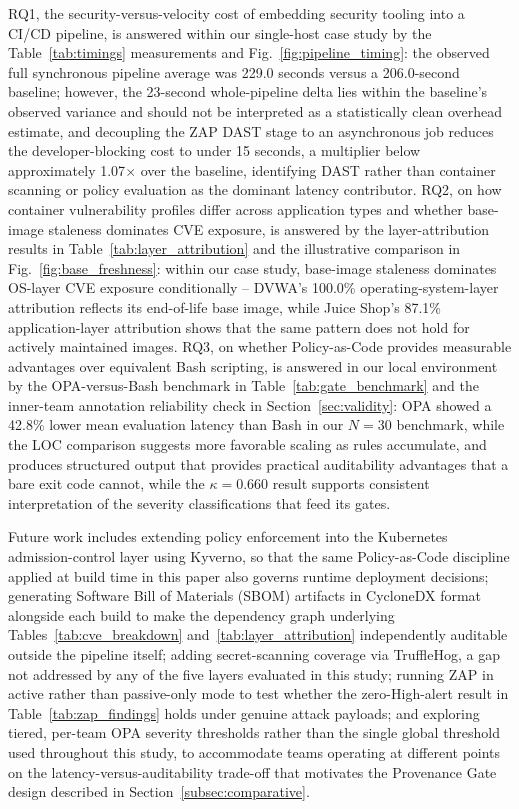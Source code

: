 \documentclass[conference]{IEEEtran}
\begin{document}
RQ1, the security-versus-velocity cost of embedding security tooling into a CI/CD pipeline, is answered within our single-host case study by the Table~\ref{tab:timings} measurements and Fig.~\ref{fig:pipeline_timing}: the observed full synchronous pipeline average was 229.0 seconds versus a 206.0-second baseline; however, the 23-second whole-pipeline delta lies within the baseline's observed variance and should not be interpreted as a statistically clean overhead estimate, and decoupling the ZAP DAST stage to an asynchronous job reduces the developer-blocking cost to under 15 seconds, a multiplier below approximately 1.07$\times$ over the baseline, identifying DAST rather than container scanning or policy evaluation as the dominant latency contributor. RQ2, on how container vulnerability profiles differ across application types and whether base-image staleness dominates CVE exposure, is answered by the layer-attribution results in Table~\ref{tab:layer_attribution} and the illustrative comparison in Fig.~\ref{fig:base_freshness}: within our case study, base-image staleness dominates OS-layer CVE exposure conditionally -- DVWA's 100.0\% operating-system-layer attribution reflects its end-of-life base image, while Juice Shop's 87.1\% application-layer attribution shows that the same pattern does not hold for actively maintained images. RQ3, on whether Policy-as-Code provides measurable advantages over equivalent Bash scripting, is answered in our local environment by the OPA-versus-Bash benchmark in Table~\ref{tab:gate_benchmark} and the inner-team annotation reliability check in Section~\ref{sec:validity}: OPA showed a 42.8\% lower mean evaluation latency than Bash in our $N=30$ benchmark, while the LOC comparison suggests more favorable scaling as rules accumulate, and produces structured output that provides practical auditability advantages that a bare exit code cannot, while the $\kappa = 0.660$ result supports consistent interpretation of the severity classifications that feed its gates.

Future work includes extending policy enforcement into the Kubernetes admission-control layer using Kyverno, so that the same Policy-as-Code discipline applied at build time in this paper also governs runtime deployment decisions; generating Software Bill of Materials (SBOM) artifacts in CycloneDX format alongside each build to make the dependency graph underlying Tables~\ref{tab:cve_breakdown} and~\ref{tab:layer_attribution} independently auditable outside the pipeline itself; adding secret-scanning coverage via TruffleHog, a gap not addressed by any of the five layers evaluated in this study; running ZAP in active rather than passive-only mode to test whether the zero-High-alert result in Table~\ref{tab:zap_findings} holds under genuine attack payloads; and exploring tiered, per-team OPA severity thresholds rather than the single global threshold used throughout this study, to accommodate teams operating at different points on the latency-versus-auditability trade-off that motivates the Provenance Gate design described in Section~\ref{subsec:comparative}.
\end{document}
